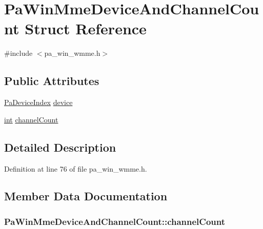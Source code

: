 \hypertarget{struct_pa_win_mme_device_and_channel_count}{}\section{Pa\+Win\+Mme\+Device\+And\+Channel\+Count Struct Reference}
\label{struct_pa_win_mme_device_and_channel_count}


{\ttfamily \#include $<$pa\+\_\+win\+\_\+wmme.\+h$>$}

\subsection*{Public Attributes}
\begin{DoxyCompactItemize}
\item 
\hyperlink{portaudio_8h_ad79317e65bde63d76c4b8e711ac5a361}{Pa\+Device\+Index} \hyperlink{struct_pa_win_mme_device_and_channel_count_afeb111df3482e661fa903bbc0ee0f908}{device}
\item 
\hyperlink{xmltok_8h_a5a0d4a5641ce434f1d23533f2b2e6653}{int} \hyperlink{struct_pa_win_mme_device_and_channel_count_ab022a761007bd0a86305da52e70ed32b}{channel\+Count}
\end{DoxyCompactItemize}


\subsection{Detailed Description}


Definition at line 76 of file pa\+\_\+win\+\_\+wmme.\+h.



\subsection{Member Data Documentation}
\subsubsection[{\texorpdfstring{channel\+Count}{channelCount}}]{ Pa\+Win\+Mme\+Device\+And\+Channel\+Count\+::channel\+Count}\hypertarget{struct_pa_win_mme_device_and_channel_count_ab022a761007bd0a86305da52e70ed32b}{}\label{struct_pa_win_mme_device_and_channel_count_ab022a761007bd0a86305da52e70ed32b}


